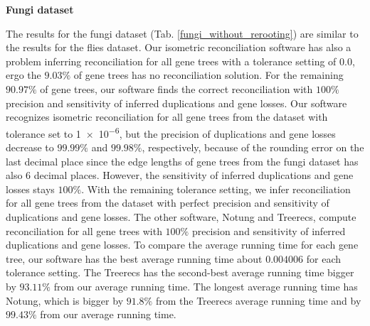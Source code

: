 \noindent \textbf{Fungi dataset}

The results for the fungi dataset (Tab. \ref{fungi_without_rerooting}) are similar to the results for the flies dataset. Our isometric reconciliation software has also a problem inferring reconciliation for all gene trees with a tolerance setting of $0.0$, ergo the $9.03\%$ of gene trees has no reconciliation solution. For the remaining $90.97\%$ of gene trees, our software finds the correct reconciliation with $100\%$ precision and sensitivity of inferred duplications and gene losses. Our software recognizes isometric reconciliation for all gene trees from the dataset with tolerance set to \num{1e-6}, but the precision of duplications and gene losses decrease to $99.99\%$ and $99.98\%$, respectively, because of the rounding error on the last decimal place since the edge lengths of gene trees from the fungi dataset has also 6 decimal places. However, the sensitivity of inferred duplications and gene losses stays $100\%$. With the remaining tolerance setting, we infer reconciliation for all gene trees from the dataset with perfect precision and sensitivity of duplications and gene losses. The other software, Notung and Treerecs, compute reconciliation for all gene trees with $100\%$ precision and sensitivity of inferred duplications and gene losses. To compare the average running time for each gene tree, our software has the best average running time about $0.004006$ for each tolerance setting. The Treerecs has the second-best average running time bigger by $93.11\%$ from our average running time. The longest average running time has Notung, which is bigger by $91.8\%$ from the Treerecs average running time and by $99.43\%$ from our average running time.


